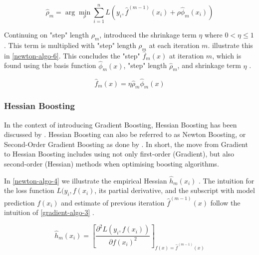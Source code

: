 \begin{equation}
\label{gradient-algo-5}
    \hat{\rho}_m = \arg\min_{\rho} \sum_{i=1}^{n}L(y_i,\hat{f}^{(m-1)}(x_i)+\rho\hat{\phi}_m(x_i))
\end{equation}

Continuing on "step" length $\rho_m$, \textcite{friedman-greedy-function-approximation} introduced the shrinkage term $\eta$ where $0<\eta\leq1$. This term is multiplied with "step" length $\rho_m$ at each iteration $m$. \textcite{ntnu-thesis-why-does-xgboost-win-every-machine-learning-competition} illustrate this in \autoref{newton-algo-6}. This concludes the "step" $\hat{f}_m(x)$ at iteration $m$, which is found using the basis function $\hat{\phi}_m(x)$, "step" length $\hat{\rho}_m$, and shrinkage term $\eta$ \parencite{ntnu-thesis-why-does-xgboost-win-every-machine-learning-competition}.

\begin{equation}
\label{gradient-algo-6}
    \hat{f}_m(x)=\eta\hat{\rho}_m\hat{\phi}_m(x)
\end{equation}

\subsubsection{Hessian Boosting}

In the context of introducing Gradient Boosting, Hessian Boosting has been discussed by \textcite{friedman-greedy-function-approximation}. Hessian Boosting can also be referred to as Newton Boosting, or Second-Order Gradient Boosting as done by \textcite{ntnu-thesis-why-does-xgboost-win-every-machine-learning-competition}. In short, the move from Gradient to Hessian Boosting includes using not only first-order (Gradient), but also second-order (Hessian) methods when optimising boosting algorithms. 

In \autoref{newton-algo-4} we illustrate the empirical Hessian $\hat{h}_{m}(x_i)$ \parencite{ntnu-thesis-why-does-xgboost-win-every-machine-learning-competition}. The intuition for the loss function $L(y_i,f(x_i)$, its partial derivative, and the subscript with model prediction $f(x_i)$ and estimate of previous iteration $\hat{f}^{(m-1)}(x)$ follow the intuition of \autoref{gradient-algo-3} \parencite{ntnu-thesis-why-does-xgboost-win-every-machine-learning-competition}. 

\begin{equation}
\label{newton-algo-4}
    \hat{h}_{m}(x_i)=\left[\frac{\partial^{2} L(y_i, f(x_i))}{\partial f(x_i)^{2}} \right]_{f(x)=\hat{f}^{(m-1)}(x)}
\end{equation}

